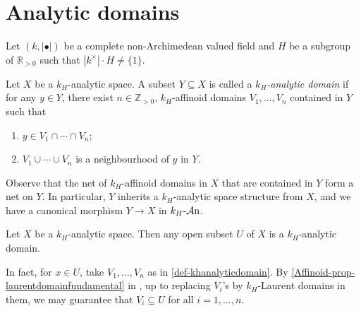 \section{Analytic domains}
Let $(k,|\bullet|)$ be a complete non-Archimedean valued field and $H$ be a subgroup of $\mathbb{R}_{>0}$ such that $|k^{\times}|\cdot H\neq \{1\}$.

\begin{definition}\label{def-khanalyticdomain}
    Let $X$ be a $k_H$-analytic space. A subset $Y\subseteq X$ is called a \emph{$k_H$-analytic domain} if for any $y\in Y$, there exist $n\in \mathbb{Z}_{>0}$, $k_H$-affinoid domains $V_1,\ldots,V_n$ contained in $Y$ such that
    \begin{enumerate}
        \item $y\in V_1\cap \cdots\cap V_n$;
        \item $V_1\cup\cdots\cup V_n$ is a neighbourhood of $y$ in $Y$.
    \end{enumerate}
\end{definition}
Observe that the net of $k_H$-affinoid domains in $X$ that are contained in $Y$ form a net on $Y$. In particular, $Y$ inherits a $k_H$-analytic space structure from $X$, and we have a canonical morphism $Y\rightarrow X$ in $k_H\text{-}\mathcal{A}\mathrm{n}$.

\begin{example}\label{ex-opensubspace}
    Let $X$ be a $k_H$-analytic space. Then any open subset $U$ of $X$ is a $k_H$-analytic domain. 

    In fact, for $x\in U$, take $V_1,\ldots,V_n$ as in \cref{def-khanalyticdomain}. By \cref{Affinoid-prop-laurentdomainfundamental} in , up to replacing $V_i$'s by $k_H$-Laurent domains in them, we may guarantee that $V_i\subseteq U$ for all $i=1,\ldots,n$.
\end{example}


